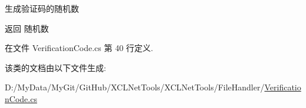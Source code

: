 生成验证码的随机数 

\begin{DoxyReturn}{返回}
随机数
\end{DoxyReturn}


在文件 Verification\-Code.\-cs 第 40 行定义.



该类的文档由以下文件生成\-:\begin{DoxyCompactItemize}
\item 
D\-:/\-My\-Data/\-My\-Git/\-Git\-Hub/\-X\-C\-L\-Net\-Tools/\-X\-C\-L\-Net\-Tools/\-File\-Handler/\hyperlink{_verification_code_8cs}{Verification\-Code.\-cs}\end{DoxyCompactItemize}
